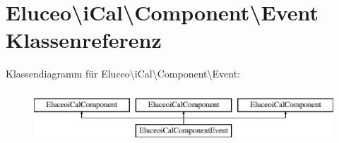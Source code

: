 \hypertarget{class_eluceo_1_1i_cal_1_1_component_1_1_event}{}\section{Eluceo\textbackslash{}i\+Cal\textbackslash{}Component\textbackslash{}Event Klassenreferenz}
\label{class_eluceo_1_1i_cal_1_1_component_1_1_event}
Klassendiagramm für Eluceo\textbackslash{}i\+Cal\textbackslash{}Component\textbackslash{}Event\+:\begin{figure}[H]
\begin{center}
\leavevmode
\includegraphics[height=1.985816cm]{class_eluceo_1_1i_cal_1_1_component_1_1_event}
\end{center}
\end{figure}
